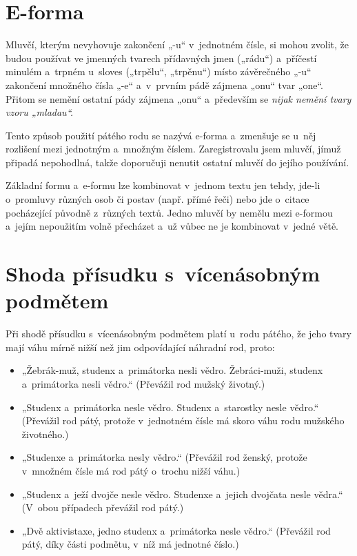 %
%
%
\section{E-forma}

Mluvčí, kterým nevyhovuje zakončení „-u“ v jednotném čísle, si mohou zvolit,
že budou používat ve jmenných tvarech přídavných jmen („rádu“)
a příčestí minulém a trpném u sloves („trpělu“, „trpěnu“) místo
závěrečného „-u“ zakončení množného čísla „-e“ a v prvním pádě
zájmena „onu“ tvar „one“. Přitom se nemění ostatní pády zájmena „onu“
a především se \emph{nijak nemění tvary vzoru „mladau“.}

Tento způsob použití pátého rodu se nazývá e-forma a zmenšuje se u něj
rozlišení mezi jednotným a množným číslem. Zaregistrovalu jsem mluvčí,
jímuž připadá nepohodlná, takže doporučuji nenutit ostatní mluvčí
do jejího používání.

Základní formu a e-formu lze kombinovat v jednom textu jen tehdy,
jde-li o promluvy různých osob či postav (např. přímé řeči) nebo jde
o citace pocházející původně z různých textů. Jedno mluvčí by nemělu
mezi e-formou a jejím nepoužitím volně přecházet a už vůbec ne
je kombinovat v jedné větě.

\section{Shoda přísudku s vícenásobným podmětem}

Při shodě přísudku s vícenásobným podmětem platí u rodu pátého, že jeho tvary
mají váhu mírně nižší než jim odpovídající náhradní rod, proto:

\begin{itemize}
\item „Žebrák-muž, studenx a primátorka nesli vědro. Žebráci-muži, studenx a primátorka nesli vědro.“ (Převážil rod mužský životný.)
\item „Studenx a primátorka nesle vědro. Studenx a starostky nesle vědro.“ (Převážil rod pátý, protože v jednotném čísle má skoro váhu rodu mužského životného.)
\item „Studenxe a primátorka nesly vědro.“ (Převážil rod ženský, protože v množném čísle má rod pátý o trochu nižší váhu.)
\item „Studenx a ježí dvojče nesle vědro. Studenxe a jejich dvojčata nesle vědra.“ (V obou případech převážil rod pátý.)
\item „Dvě aktivistaxe, jedno studenx a primátorka nesle vědro.“ (Převážil rod pátý, díky části podmětu, v níž má jednotné číslo.)
\end{itemize}

